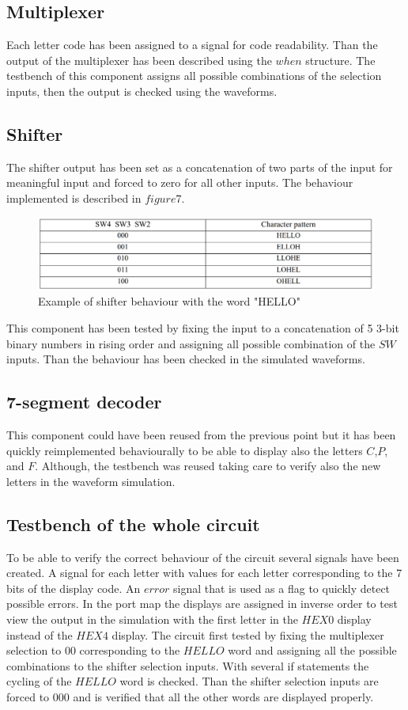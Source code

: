 \documentclass[12pt]{article}
\begin{document}
\subsection{Multiplexer}
Each letter code has been assigned to a signal for code readability. Than the output of the multiplexer has been described using the $when$ structure.\newline
The testbench of this component assigns all possible combinations of the selection inputs, then the output is checked using the waveforms.
\subsection{Shifter}
The shifter output has been set as a concatenation of two parts of the input for meaningful input and forced to zero for all other inputs. The behaviour implemented is described in $figure 7$.
\begin{figure}[h]
	\centering
	\includegraphics[scale = 0.2]{Berchialla_PuntoB/image3.jpg}
	\caption{Example of shifter behaviour with the word "HELLO"}
\end{figure}
This component has been tested by fixing the input to a concatenation of 5 3-bit binary numbers in rising order and assigning all possible combination of the $SW$ inputs. Than the behaviour has been checked in the simulated waveforms.
\subsection{7-segment decoder}
This component could have been reused from the previous point but it has been quickly reimplemented behaviourally to be able to display also the letters $C$,$P$, and $F$. Although, the testbench was reused taking care to verify also the new letters in the waveform simulation.
\subsection{Testbench of the whole circuit}
To be able to verify the correct behaviour of the circuit several signals have been created. \newline
A signal for each letter with values for each letter corresponding to the 7 bits of the display code.
An $error$ signal that is used as a flag to quickly detect possible errors.\newline
In the port map the displays are assigned in inverse order to test view the output in the simulation with the first letter in the $HEX0$ display instead of the $HEX4$ display.\newline
The circuit first tested by fixing the multiplexer selection to $00$ corresponding to the $HELLO$ word and assigning all the possible combinations to the shifter selection inputs. With several if statements the cycling of the $HELLO$ word is checked. \newline
Than the shifter selection inputs are forced to $000$ and is verified that all the other words are displayed properly.
\end{document}
